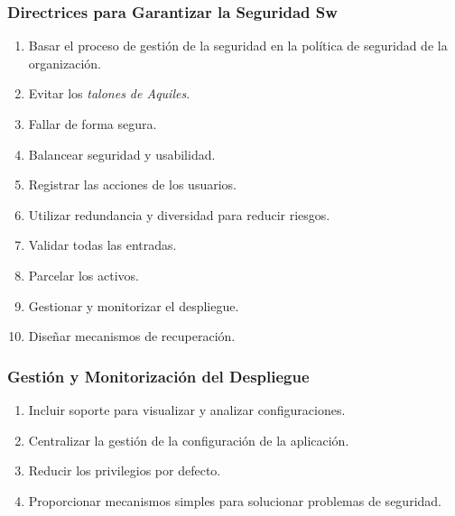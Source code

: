 \documentclass[handout,a4paper,slidestop,xcolor=pst,dvips,blue]{beamer}
\begin{document}
\begin{frame}[c]
    \frametitle{Directrices para Garantizar la Seguridad Sw}
    \begin{enumerate}[<+->]
        \item Basar el proceso de gestión de la seguridad en la política de seguridad de la organización.
        \item Evitar los \emph{talones de Aquiles}.
        \item Fallar de forma segura.
        \item Balancear seguridad y usabilidad.
        \item Registrar las acciones de los usuarios.
        \item Utilizar redundancia y diversidad para reducir riesgos.
        \item Validar todas las entradas.
        \item Parcelar los activos.
        \item Gestionar y monitorizar el despliegue.
        \item Diseñar mecanismos de recuperación.
    \end{enumerate}
\end{frame}

\begin{frame}[c]
    \frametitle{Gestión y Monitorización del Despliegue}
    \begin{enumerate}[<+->]
        \item Incluir soporte para visualizar y analizar configuraciones.
        \item Centralizar la gestión de la configuración de la aplicación.
        \item Reducir los privilegios por defecto.
        \item Proporcionar mecanismos simples para solucionar problemas de seguridad.
    \end{enumerate}
\end{frame}
\end{document}

